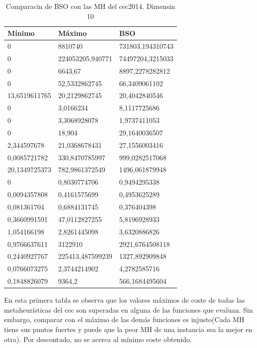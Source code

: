 \begin{table}[htbp]
	\begin{center}
		\begin{tabular}{|l|l|l|}
			\hline
			Mínimo & Máximo & BSO \\
			\hline \hline
			0 & 8810740 & 731803,194310743 \\ \hline
			0 & 224053205,940771 & 74497204,3215033 \\ \hline
			0 & 6643,67 & 8897,2278282812 \\ \hline
			0 & 52,5332862745 & 66,3409061102 \\ \hline
			13,6519611765 & 20,2129862745 & 20,4042840546\\ \hline
			0 & 3,0166234 & 8,1117725686\\ \hline
			0 & 3,3068928078 & 1,9737411053\\ \hline
			0 & 18,904 & 29,1640036507\\ \hline
			2,344597678 & 21,0368678431 & 27,1556003416\\ \hline
			0,0085721782 & 330,8470785997 & 999,0282517068\\ \hline
			20,1349725373 & 782,9861372549 & 1496,061879948\\ \hline
			0 & 0,8030774706 & 0,9494295338\\ \hline
			0,0094357808 & 0,4161575699 & 0,4953625289\\ \hline
			0,081361704 & 0,6884131745 & 0,376404398\\ \hline
			0,3660991591 & 47,0112827255 & 5,8196928933\\ \hline
			1,054166198 & 2,8261445098 & 3,6320886826\\ \hline
			0,9766637611 & 3122910 & 2921,6764508118\\ \hline
			0,2440927767 & 225413,487599239 & 1327,892909848\\ \hline
			0,0766073275 & 2,3744214902 & 4,2782585716\\ \hline
			0,1848826079 & 9364,2 & 566,1684495604\\ \hline
			
			
		\end{tabular}
		\caption{Comparacin de BSO con las MH del cec2014. Dimensin 10}
		\label{tabla:Dimension10Comparativa}
	\end{center}
\end{table}

En esta primera tabla se observa que los valores máximos de coste de todas las metaheurísticas del cec son superadas en alguna de las funciones que evaluan. Sin embargo, comparar con el máximo de las demás funciones es injusto(Cada MH tiene sus puntos fuertes y puede que la peor MH de una instancia sea la mejor en otra). Por descontado, no se acerca al mínimo coste obtenido.\\

